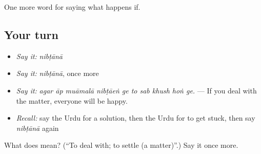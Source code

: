 \begin{grammarlens}[title={What you've built}]
One more word for saying what happens if.
\end{grammarlens}

\subsection*{Your turn}
\begin{itemize}
\raggedright
  \item \emph{Say it:} \emph{nibṭānā}
  \item \emph{Say it:} \emph{nibṭānā}, once more
  \item \emph{Say it:} \emph{agar āp muāmalā nibṭāeṅ ge to sab khush hoṅ ge.} — If you deal with the matter, everyone will be happy.
  \item \emph{Recall:} say the Urdu for a solution, then the Urdu for to get stuck, then say \emph{nibṭānā} again
\end{itemize}

\begin{tcolorbox}[breakable,colback=teal!4,colframe=teal!35!black,title={Before you move on}]
What does  mean? (\textquotedblleft{}To deal with; to settle (a matter)\textquotedblright{}.) Say it once more.
\end{tcolorbox}
